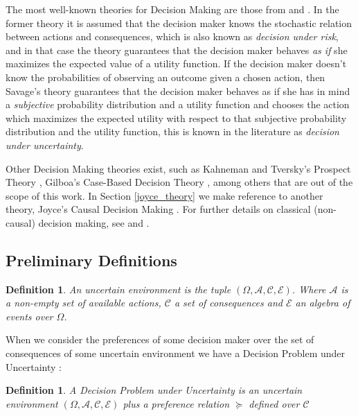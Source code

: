 \documentclass[review]{elsarticle}
\newtheorem{definition}[theorem]{Definition}
\begin{document}
The most well-known theories for Decision Making are those from \cite{von1944theory} and \cite{savage1954the}. In the former theory it is assumed that the decision maker knows the stochastic relation between actions and consequences, which is also known as \textit{decision under risk}, and in that case the theory guarantees that the decision maker behaves \textit{as if} she maximizes the expected value of a utility function. If the decision maker doesn't know the probabilities of observing an outcome given a chosen action, then Savage's theory guarantees that the decision maker behaves as if she has in mind a \textit{subjective} probability distribution and a utility function and chooses the action which maximizes the expected utility with respect to that subjective probability distribution and the utility function, this is known in the literature as \textit{decision under uncertainty}.

Other Decision Making theories exist, such as Kahneman and Tversky's Prospect Theory \citep{kahneman1979prospect}, Gilboa's Case-Based Decision Theory \citep{gilboa1995case}, among others that are out of the scope of this work. In Section \ref{joyce_theory} we make reference to another theory, Joyce's Causal Decision Making \citep{joyce1999foundations}. For further details on classical (non-causal) decision making, see \cite{bernardo2000bayesian} and \cite{gilboa2009decision}.

\subsection{Preliminary Definitions}
\label{definitions}
\begin{definition}
An uncertain environment is the tuple $(\Omega, \mathcal{A},\mathcal{C},\mathcal{E})$. Where $\mathcal{A}$ is a non-empty set of available actions, $\mathcal{C}$ a set of consequences and $\mathcal{E}$ an algebra of events over $\Omega$. 
\end{definition}

When we consider the preferences of some decision maker over the set of consequences of some uncertain environment we have a Decision Problem under Uncertainty \citep{bernardo2000bayesian}:

\begin{definition}
A Decision Problem under Uncertainty is an uncertain environment $(\Omega, \mathcal{A},\mathcal{C},\mathcal{E})$ plus a preference relation $\succeq$ defined over $\mathcal{C}$ 
\end{definition}
\end{document}
